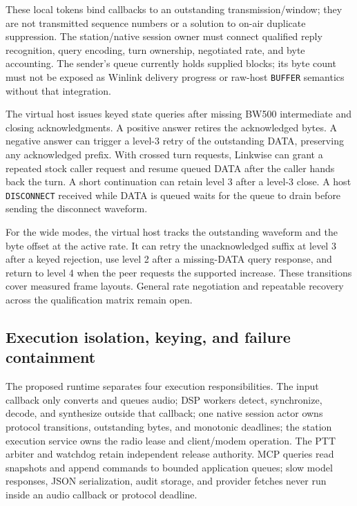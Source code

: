 These local tokens bind callbacks to an outstanding transmission/window; they
are not transmitted sequence numbers or a solution to on-air duplicate
suppression. The station/native session owner must connect qualified reply
recognition, query encoding, turn ownership, negotiated rate, and byte
accounting. The sender's queue currently holds supplied blocks; its byte count
must not be exposed as Winlink delivery progress or raw-host \texttt{BUFFER}
semantics without that integration.

The virtual host issues keyed state queries after missing BW500
intermediate and closing acknowledgments. A positive answer retires the
acknowledged bytes. A negative answer can trigger a level-3 retry of the
outstanding DATA, preserving any acknowledged prefix. With crossed turn
requests, Linkwise can grant a repeated stock caller request and resume
queued DATA after the caller hands back the turn. A short continuation
can retain level 3 after a level-3 close. A host \texttt{DISCONNECT}
received while DATA is queued waits for the queue to drain before
sending the disconnect waveform.

For the wide modes, the virtual host tracks the outstanding waveform and
the byte offset at the active rate. It can retry the unacknowledged suffix
at level 3 after a keyed rejection, use level 2 after a missing-DATA query
response, and return to level 4 when the peer requests the supported
increase. These transitions cover measured frame layouts. General rate
negotiation and repeatable recovery across the qualification matrix
remain open.


\subsection{Execution isolation, keying, and failure containment}
The proposed runtime separates four execution responsibilities. The input
callback only converts and queues audio; DSP workers detect, synchronize,
decode, and synthesize outside that callback; one native session actor owns
protocol transitions, outstanding bytes, and monotonic deadlines; the station
execution service owns the radio lease and client/modem operation. The PTT
arbiter and watchdog retain independent release authority. MCP queries read
snapshots and append commands to bounded application queues; slow model
responses, JSON serialization, audit storage, and provider fetches never run
inside an audio callback or protocol deadline.

